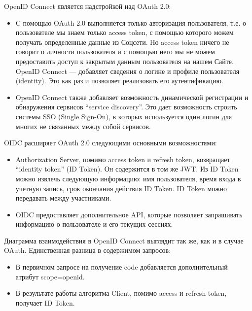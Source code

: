 OpenID Connect является надстройкой над OAuth 2.0:

\begin{itemize}
    \item C помощью OAuth 2.0 выполняется только авторизация пользователя, т.е. о пользователе мы знаем только access token, с помощью которого можем получать определенные данные из Соцсети. Но access token ничего не говорит о личности пользователя и с помощью него мы не можем предоставить доступ к закрытым данным пользователя на нашем Сайте. OpenID Connect — добавляет сведения о логине и профиле пользователя (identity). Это как раз и позволяет реализовать его аутентификацию.
    \item OpenID Connect также добавляет возможность динамической регистрации и обнаружения сервисов “service discovery”. Это дает возможность строить системы SSO (Single Sign-On), в которых используется один логин для многих не связанных между собой сервисов.\autocite{OpenIDConnect}
\end{itemize}

OIDC расширяет OAuth 2.0 следующими основными возможностями:

\begin{itemize}
    \item Authorization Server, помимо access token и refresh token, возвращает “identity token” (ID Token). Он содержится в том же JWT. Из ID Token можно извлечь следующую информацию: имя пользователя, время входа в учетную запись, срок окончания действия ID Token. ID Token можно передавать между участниками.
    \item OIDC предоставляет дополнительное API, которые позволяет запрашивать информацию о пользователе и его текущих сессиях.\autocite{OpenIDConnect}
\end{itemize}

Диаграмма взаимодействия в OpenID Connect выглядит так же, как и в случае OAuth. Единственная разница в содержимом запросов:

\begin{itemize}
    \item В первичном запросе на получение code добавляется дополнительный атрибут scope=openid.
    \item В результате работы алгоритма Client, помимо access и refresh token, получает ID Token.\autocite{Authorization}
\end{itemize}
